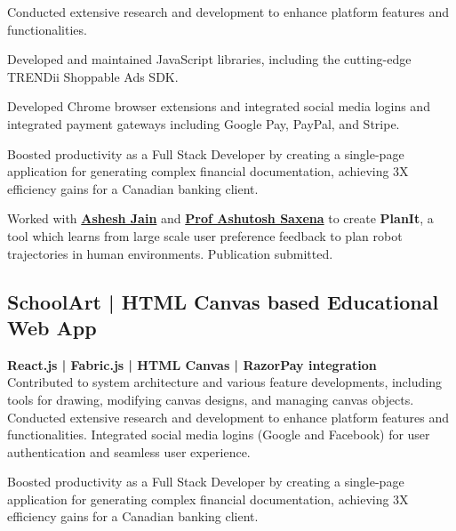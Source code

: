 \documentclass[letterpaper]{deedy-resume} %
\begin{document}
\begin{minipage}[t]{0.66\textwidth}
Conducted extensive research and development to enhance platform features and functionalities.

Developed and maintained JavaScript libraries, including the cutting-edge TRENDii Shoppable Ads SDK.

Developed Chrome browser extensions and integrated social media logins and integrated payment gateways including Google Pay, PayPal, and Stripe.

Boosted productivity as a Full Stack Developer by creating a single-page application for generating complex financial documentation, achieving 3X efficiency gains for a Canadian banking client.

\sectionspace %


Worked with \textbf{\href{http://www.cs.cornell.edu/~ashesh/}{Ashesh Jain}} and \textbf{\href{http://www.cs.cornell.edu/~asaxena/}{Prof Ashutosh Saxena}} to create \textbf{PlanIt}, a tool which learns from large scale user preference feedback to plan robot trajectories in human environments. Publication submitted.

\sectionspace %


\subsection{SchoolArt | HTML Canvas based Educational Web App}


\textbf{React.js | Fabric.js | HTML Canvas | RazorPay integration} \\

Contributed to system architecture and various feature developments, including tools for drawing, modifying canvas designs, and managing canvas objects.
Conducted extensive research and development to enhance platform features and functionalities.
Integrated social media logins (Google and Facebook) for user authentication and seamless user experience.

Boosted productivity as a Full Stack Developer by creating a single-page application for generating complex financial documentation, achieving 3X efficiency gains for a Canadian banking client.

\sectionspace %




\end{minipage} %
\end{document}
